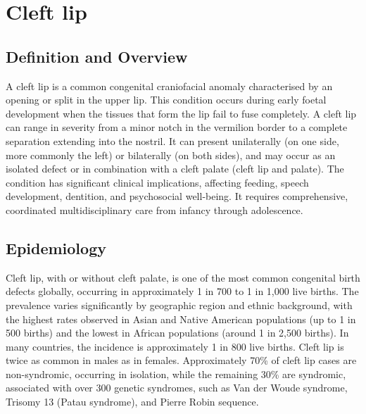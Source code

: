 \chapter{Cleft lip}

\section*{Definition and Overview}
A cleft lip is a common congenital craniofacial anomaly characterised by an opening or split in the upper lip. This condition occurs during early foetal development when the tissues that form the lip fail to fuse completely. A cleft lip can range in severity from a minor notch in the vermilion border to a complete separation extending into the nostril. It can present unilaterally (on one side, more commonly the left) or bilaterally (on both sides), and may occur as an isolated defect or in combination with a cleft palate (cleft lip and palate). The condition has significant clinical implications, affecting feeding, speech development, dentition, and psychosocial well-being. It requires comprehensive, coordinated multidisciplinary care from infancy through adolescence.

\section*{Epidemiology}
Cleft lip, with or without cleft palate, is one of the most common congenital birth defects globally, occurring in approximately 1 in 700 to 1 in 1,000 live births. The prevalence varies significantly by geographic region and ethnic background, with the highest rates observed in Asian and Native American populations (up to 1 in 500 births) and the lowest in African populations (around 1 in 2,500 births). In many countries, the incidence is approximately 1 in 800 live births. Cleft lip is twice as common in males as in females. Approximately 70\% of cleft lip cases are non-syndromic, occurring in isolation, while the remaining 30\% are syndromic, associated with over 300 genetic syndromes, such as Van der Woude syndrome, Trisomy 13 (Patau syndrome), and Pierre Robin sequence.

